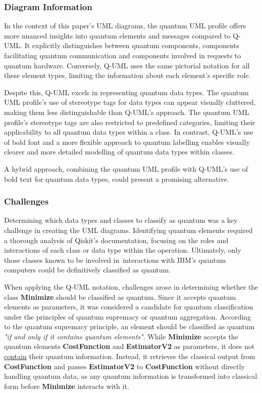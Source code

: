 \documentclass{article}
\begin{document}
\subsubsection{Diagram Information}

In the context of this paper's UML diagrams, the quantum UML profile offers more nuanced insights into quantum elements and messages compared to Q-UML. It explicitly distinguishes between quantum components, components facilitating quantum communication and components involved in requests to quantum hardware. Conversely, Q-UML uses the same pictorial notation for all these element types, limiting the information about each element's specific role.

Despite this, Q-UML excels in representing quantum data types. The quantum UML profile’s use of stereotype tags for data types can appear visually cluttered, making them less distinguishable than Q-UML’s approach. The quantum UML profile's stereotype tags are also restricted to predefined categories, limiting their applicability to all quantum data types within a class. In contrast, Q-UML's use of bold font and a more flexible approach to quantum labelling enables visually clearer and more detailed modelling of quantum data types within classes.

A hybrid approach, combining the quantum UML profile with Q-UML's use of bold text for quantum data types, could present a promising alternative.

\subsubsection{Challenges}

Determining which data types and classes to classify as quantum was a key challenge in creating the UML diagrams. Identifying quantum elements required a thorough analysis of Qiskit’s documentation, focusing on the roles and interactions of each class or data type within the operation. Ultimately, only those classes known to be involved in interactions with IBM's quantum computers could be definitively classified as quantum. 

When applying the Q-UML notation, challenges arose in determining whether the class \textbf{Minimize} should be classified as quantum. Since it accepts quantum elements as parameters, it was considered a candidate for quantum classification under the principles of quantum supremacy or quantum aggregation. According to the quantum supremacy principle, an element should be classified as quantum \textit{"if and only if it contains quantum elements"}\cite{Pérez-Castillo2022}. While \textbf{Minimize} accepts the quantum elements \textbf{CostFunction} and \textbf{EstimatorV2} as parameters, it does not \underline{contain} their quantum information. Instead, it retrieves the classical output from \textbf{CostFunction} and passes \textbf{EstimatorV2} to \textbf{CostFunction} without directly handling quantum data, as any quantum information is transformed into classical form before \textbf{Minimize} interacts with it.
\end{document}
